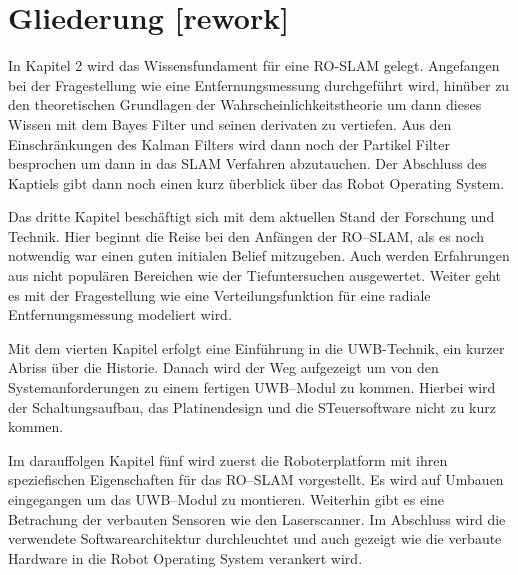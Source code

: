\begin{comment}
------------------------------------------------------------------------------------------
- Wie ist die Bachelorarbeit aufgebaut?
- Was erwartet einen in den folgenden Kapitel/Abschnitten?
- Pro Kapitel einen Absatz.
- auf keinen Fall nur eine Wiederholung des Inhaltsverzeichnisses sein
- Wie bauen die Kapitel aufeinander auf? Dies muss erläutert und nicht nacherzählt werden.
- Überblick über den Aufbau der Bachelorarbeit: Wie bauen die einzelnen Kapitel aufeinander auf, welcher Argumentationslinie wird gefolgt; dieser sollte aber nie eine Nacherzählung der Inhaltsverzeichnisses sein!
- Schlussendlich gibst du dem Leser einen Gesamtüberblick über deine Bachelorarbeit, in dem du den Aufbau erläuterst, den roten Faden erkennen lässt und darstellst, wie die Forschungsfragen beantwortet werden.
\end{comment}
\section{Gliederung [rework]}

In Kapitel 2 wird das Wissensfundament für eine RO-SLAM gelegt. Angefangen bei der Fragestellung wie eine Entfernungsmessung durchgeführt wird, hinüber zu den theoretischen Grundlagen der Wahrscheinlichkeitstheorie um dann dieses Wissen mit dem Bayes Filter und seinen derivaten zu vertiefen. Aus den Einschränkungen des Kalman Filters wird dann noch der Partikel Filter besprochen um dann in das SLAM Verfahren abzutauchen. Der Abschluss des Kaptiels gibt dann noch einen kurz überblick über das Robot Operating System.

Das dritte Kapitel beschäftigt sich mit dem aktuellen Stand der Forschung und Technik. Hier beginnt die Reise bei den Anfängen der RO--SLAM, als es noch notwendig war einen guten initialen Belief mitzugeben. Auch werden Erfahrungen aus nicht populären Bereichen wie der Tiefuntersuchen ausgewertet. Weiter geht es  mit der Fragestellung wie eine Verteilungsfunktion für eine radiale Entfernungsmessung modeliert wird. 

Mit dem vierten Kapitel erfolgt eine Einführung in die UWB-Technik, ein kurzer Abriss über die Historie. Danach wird der Weg aufgezeigt um von den Systemanforderungen zu einem fertigen UWB--Modul zu kommen. Hierbei wird der Schaltungsaufbau, das Platinendesign und die STeuersoftware nicht zu kurz kommen.

Im darauffolgen Kapitel fünf wird zuerst die Roboterplatform mit ihren speziefischen Eigenschaften für das RO--SLAM vorgestellt. Es wird auf Umbauen eingegangen um das UWB--Modul zu montieren. Weiterhin gibt es eine Betrachung der verbauten Sensoren wie den Laserscanner. Im Abschluss wird die verwendete Softwarearchitektur durchleuchtet und auch gezeigt wie die verbaute Hardware in die Robot Operating System verankert wird.


